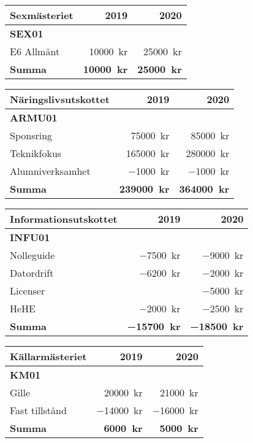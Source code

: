 \documentclass[10pt]{article}
\begin{document}
    \begin{tabularx}{10cm}{X r r}
        \textbf{\large Sexmästeriet} & \textbf{2019} & \textbf{2020} \\
        \hline
        \textbf{SEX01} \\
        E6 Allmänt & \SI{10000}{kr} & \SI{25000}{kr} \\
        \hline
        \textbf{Summa} & \textbf{\SI{10000}{kr}} & \textbf{\SI{25000}{kr}} \\
    \end{tabularx}
    
    \begin{tabularx}{10cm}{X r r}
        \textbf{\large Näringslivsutskottet} & \textbf{2019} & \textbf{2020} \\
        \hline
        \textbf{ARMU01} \\
        Sponsring & \SI{75000}{kr} & \SI{85000}{kr} \\
        Teknikfokus & \SI{165000}{kr} & \SI{280000}{kr} \\
        Alumniverksamhet & \SI{-1000}{kr} & \SI{-1000}{kr} \\
        \hline
        \textbf{Summa} & \textbf{\SI{239000}{kr}} & \textbf{\SI{364000}{kr}} \\
    \end{tabularx}
    
    \begin{tabularx}{10cm}{X r r}
        \textbf{\large Informationsutskottet} & \textbf{2019} & \textbf{2020} \\
        \hline
        \textbf{INFU01} \\
        Nolleguide & \SI{-7500}{kr} & \SI{-9000}{kr} \\
        Datordrift & \SI{-6200}{kr} & \SI{-2000}{kr} \\
        Licenser & & \SI{-5000}{kr} \\
        HeHE & \SI{-2000}{kr} & \SI{-2500}{kr} \\
        \hline
        \textbf{Summa} & \textbf{\SI{-15700}{kr}} & \textbf{\SI{-18500}{kr}} \\
    \end{tabularx}
    
    \begin{tabularx}{10cm}{X r r}
        \textbf{\large Källarmästeriet} & \textbf{2019} & \textbf{2020} \\
        \hline
        \textbf{KM01} \\
        Gille & \SI{20000}{kr} & \SI{21000}{kr} \\
        Fast tillstånd & \SI{-14000}{kr} & \SI{-16000}{kr} \\
        \hline
        \textbf{Summa} & \textbf{\SI{6000}{kr}} & \textbf{\SI{5000}{kr}} \\
    \end{tabularx}
    
\end{document}
